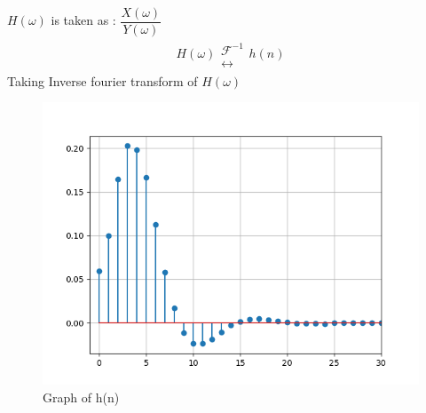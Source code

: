 \documentclass[journal,12pt,twocolumn]{IEEEtran}
\theoremstyle{remark}
\begin{document}
$H(\omega)$ is taken as : $\dfrac{X(\omega)}{Y(\omega)}$
\begin{align}
    H(\omega) \mathrel{\substack{\mathcal{F}^{-1}\\\longleftrightarrow}} h(n)
\end{align}
Taking Inverse fourier transform of $H(\omega)$
\begin{figure}[!h] 
\centering
\includegraphics[width=\columnwidth]{figs/h(n).png}
\caption{Graph of h(n)}
\end{figure}
\end{document}
